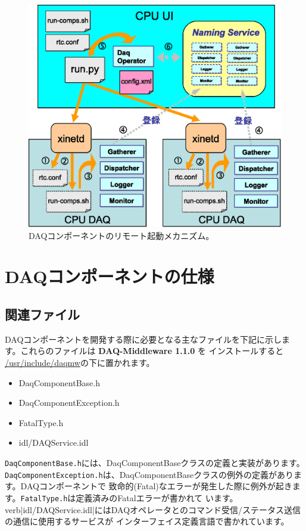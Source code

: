 \documentclass[a4j,10pt,dvips,onecolumn,oneside,final]{jarticle}%
\newcommand {\daqmwcurrent} {
	{\bf DAQ-Middleware 1.1.0}
}
\begin{document}
\begin{figure}[t]
  \centering
  \includegraphics[scale=0.7]{boot.eps}
  \caption{DAQコンポーネントのリモート起動メカニズム。}
  \label{remote-booting.fig}
\end{figure}


\section{DAQコンポーネントの仕様}\label{daqcomp}
\subsection{関連ファイル}
DAQコンポーネントを開発する際に必要となる主なファイルを下記に示します。これらのファイルは\daqmwcurrent を
インストールすると \url{/usr/include/daqmw}の下に置かれます。
\begin{itemize}
\item DaqComponentBase.h
\item DaqComponentException.h
\item FatalType.h
\item idl/DAQService.idl
\end{itemize}
\verb|DaqComponentBase.h|には、DaqComponentBaseクラスの定義と実装があります。
\verb|DaqComponentException.h|は、DaqComponentBaseクラスの例外の定義があります。DAQコンポーネントで
致命的(Fatal)なエラーが発生した際に例外が起きます。\verb|FatalType.h|は定義済みのFatalエラーが書かれて
います。verb|idl/DAQService.idl|にはDAQオペレータとのコマンド受信/ステータス送信の通信に使用するサービスが
インターフェイス定義言語で書かれています。
\end{document}
